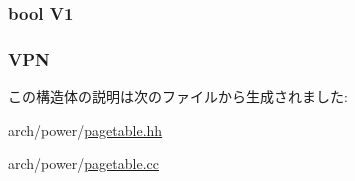 \label{structPowerISA_1_1PTE_aef8a8ddc9558c9cff93b2610dddea958}
\hypertarget{structPowerISA_1_1PTE_a2de020451ec6119f325bc89847d6f44a}{
\subsubsection[{V1}]{\setlength{\rightskip}{0pt plus 5cm}bool {\bf V1}}}
\label{structPowerISA_1_1PTE_a2de020451ec6119f325bc89847d6f44a}
\hypertarget{structPowerISA_1_1PTE_a828b555e1478c60407431dd9f779f208}{
\subsubsection[{VPN}]{ {\bf VPN}}}
\label{structPowerISA_1_1PTE_a828b555e1478c60407431dd9f779f208}


この構造体の説明は次のファイルから生成されました:\begin{DoxyCompactItemize}
\item 
arch/power/\hyperlink{power_2pagetable_8hh}{pagetable.hh}\item 
arch/power/\hyperlink{power_2pagetable_8cc}{pagetable.cc}\end{DoxyCompactItemize}
